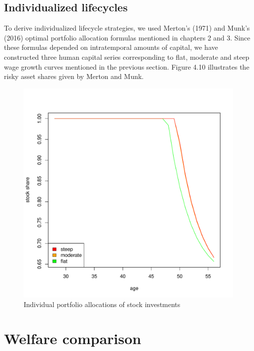 \subsection{Individualized lifecycles}

To derive individualized lifecycle strategies, we used Merton's (1971) and Munk's (2016) optimal portfolio allocation formulas mentioned in chapters 2 and 3. Since these formulas depended on intratemporal amounts of capital, we have constructed three human capital series corresponding to flat, moderate and steep wage growth curves mentioned in the previous section. Figure 4.10 illustrates the risky asset shares given by Merton and Munk. 

\begin{figure}[h]
	\centering
	\includegraphics[scale=0.6]{figs/individuals.pdf}
	\caption{Individual portfolio allocations of stock investments}
\end{figure}

\section{Welfare comparison}


